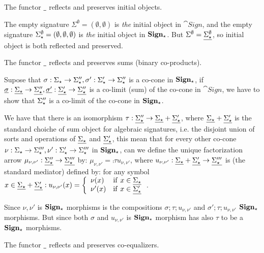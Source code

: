 \begin{lemma}
The functor $\underline{\ }$ reflects and preserves initial objects.
\end{lemma}
%
\begin{PROOF}
The empty signature $\Sigma^\emptyset=(\emptyset,\emptyset)$ is {\em the}
initial object in 
$\cat{Sign}$, and the empty signature
$\Sigma_\star^\emptyset=(\emptyset,\emptyset,\emptyset)$ is {\em the} initial
object in
${\bf Sign_\star}$.
But $\Sigma^\emptyset=\underline{\Sigma_\star^\emptyset}$, so initial object is
both reflected and preserved.
\end{PROOF}%
%
\begin{lemma} The functor $\underline{\ }$ reflects and preserves sums (binary co-products).
\end{lemma}
%
\begin{PROOF}
Supose that $\sigma:\Sigma_\star \to \Sigma''_\star, \sigma':\Sigma'_\star
\to \Sigma''_\star$ is a co-cone in ${\bf Sign_\star}$, if
$\underline{\sigma}:\underline{\Sigma_\star}\to \underline{\Sigma''_\star},
\underline{\sigma'}:\underline{\Sigma'_\star} \to \underline{\Sigma''_\star}$ is a
co-limit (sum) of the co-cone in $\cat{Sign}$, we have to show that
${\Sigma''_\star}$ is a co-limit of the co-cone in ${\bf Sign_\star}$. 

We have that there is an isomorphism $\tau:\underline{\Sigma''_\star} \to
\underline{\Sigma_\star} + \underline{\Sigma'_\star}$, where $\underline{\Sigma_\star} +
\underline{\Sigma'_\star}$ is the standard choiche of sum object for algebraic
signatures, i.e. the disjoint union of sorts and operations of
$\underline{\Sigma_\star}$ and $\underline{\Sigma'_\star}$, this mean that for every
other co-cone $\nu:\Sigma_\star \to \Sigma'''_\star, \nu':\Sigma'_\star \to
\Sigma'''_\star$ in ${\bf Sign_\star}$, can we define the unique
factorization arrow $\mu_{\nu,\nu'}: \underline{\Sigma''_\star} \to
\underline{\Sigma'''_\star}$ by: $\mu_{\nu,\nu'}= \comp{\tau}{u_{\nu,\nu'}}$,
where $u_{\nu,\nu'}: \underline{\Sigma_\star} + \underline{\Sigma'_\star} \to 
\underline{\Sigma'''_\star}$ is (the standard mediator) defined by: for any symbol
$x\in\underline{\Sigma_\star} + \underline{\Sigma'_\star}: u_{\nu,\nu'}(x) = \left\{\begin{array}{ll}
		\nu(x) & {\rm if\ } x \in \underline{\Sigma_\star} \\ 
		\nu'(x) & {\rm if\ } x \in \underline{\Sigma'_\star}\\
 \end{array}\right.$.

Since $\nu,\nu'$ is ${\bf Sign_\star}$ morphisms is the compositions
$\sigma;\tau;u_{\nu,\nu'}$ and $\sigma';\tau;u_{\nu,\nu'}$ ${\bf Sign_\star}$
morphisms. But since both $\sigma$ and $u_{\nu,\nu'}$ is ${\bf Sign_\star}$
morphism has also $\tau$ to be a ${\bf Sign_\star}$ morphisms. 
\end{PROOF}
%	 
%
\begin{lemma}\label{fa:coeq}
The functor $\underline{\ }$ reflects and preserves co-equalizers. 
\end{lemma}
%

